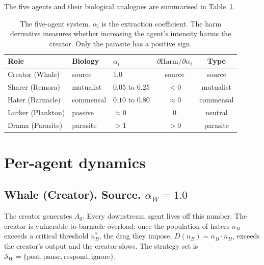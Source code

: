 \documentclass[12pt,a4paper]{article}
\begin{document}
The five agents and their biological analogues are summarised in Table~\ref{tab:agents}.

\begin{table}[H]
\centering
\begin{tabular}{lllcc}
\toprule
Role             & Biology   & $\alpha_i$       & $\partial \mathrm{Harm} / \partial \alpha_i$ & Type     \\ \midrule
Creator (Whale)  & source    & $1.0$            & source                                       & source   \\
Sharer (Remora)  & mutualist & $0.05$ to $0.25$ & $< 0$                                         & mutualist \\
Hater (Barnacle) & commensal & $0.10$ to $0.80$ & $\approx 0$                                  & commensal \\
Lurker (Plankton)& passive   & $\approx 0$      & $0$                                          & neutral   \\
Drama (Parasite) & parasite  & $> 1$            & $> 0$                                        & parasite  \\ \bottomrule
\end{tabular}
\caption{The five-agent system. $\alpha_i$ is the extraction coefficient. The harm derivative measures whether increasing the agent's intensity harms the creator. Only the parasite has a positive sign.}
\label{tab:agents}
\end{table}

\section{Per-agent dynamics}
\label{sec:dynamics}

\subsection{Whale (Creator). Source. \texorpdfstring{$\alpha_W = 1.0$}{alpha\_W = 1.0}}

The creator generates $A_0$. Every downstream agent lives off this number. The creator is vulnerable to barnacle overload: once the population of haters $n_B$ exceeds a critical threshold $n_B^{*}$, the drag they impose, $D(n_B) = \alpha_B \cdot n_B$, exceeds the creator's output and the creator slows. The strategy set is $\mathcal{S}_W = \{\text{post}, \text{pause}, \text{respond}, \text{ignore}\}$.
\end{document}
